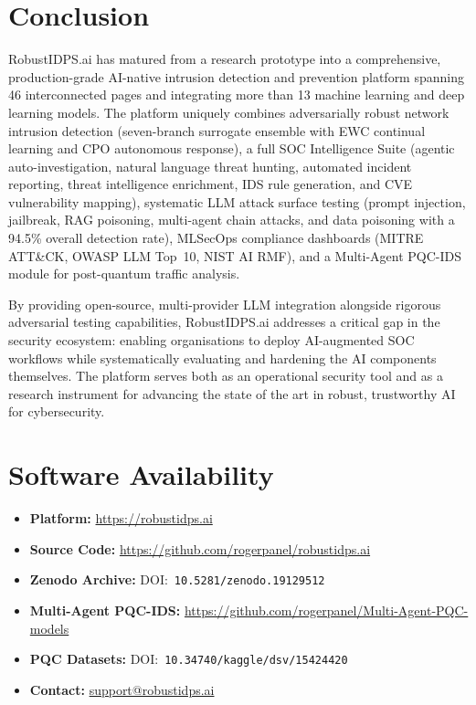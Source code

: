 \section{Conclusion}
\label{sec:conclusion}

RobustIDPS.ai has matured from a research prototype into a comprehensive,
production-grade AI-native intrusion detection and prevention platform
spanning 46 interconnected pages and integrating more than 13 machine
learning and deep learning models.  The platform uniquely combines
adversarially robust network intrusion detection (seven-branch surrogate
ensemble with EWC continual learning and CPO autonomous response),
a full SOC Intelligence Suite (agentic auto-investigation, natural language
threat hunting, automated incident reporting, threat intelligence
enrichment, IDS rule generation, and CVE vulnerability mapping),
systematic LLM attack surface testing (prompt injection, jailbreak,
RAG poisoning, multi-agent chain attacks, and data poisoning with a
94.5\% overall detection rate), MLSecOps compliance dashboards (MITRE
ATT\&CK, OWASP LLM Top~10, NIST AI RMF), and a Multi-Agent PQC-IDS
module for post-quantum traffic analysis.

By providing open-source, multi-provider LLM integration alongside
rigorous adversarial testing capabilities, RobustIDPS.ai addresses
a critical gap in the security ecosystem: enabling organisations to
deploy AI-augmented SOC workflows while systematically evaluating and
hardening the AI components themselves.  The platform serves both as
an operational security tool and as a research instrument for advancing
the state of the art in robust, trustworthy AI for cybersecurity.

\section*{Software Availability}

\begin{itemize}
  \item \textbf{Platform:} \url{https://robustidps.ai}
  \item \textbf{Source Code:} \url{https://github.com/rogerpanel/robustidps.ai}
  \item \textbf{Zenodo Archive:} DOI:~\texttt{10.5281/zenodo.19129512}
  \item \textbf{Multi-Agent PQC-IDS:} \url{https://github.com/rogerpanel/Multi-Agent-PQC-models}
  \item \textbf{PQC Datasets:} DOI:~\texttt{10.34740/kaggle/dsv/15424420}
  \item \textbf{Contact:} \href{mailto:support@robustidps.ai}{support@robustidps.ai}
\end{itemize}


